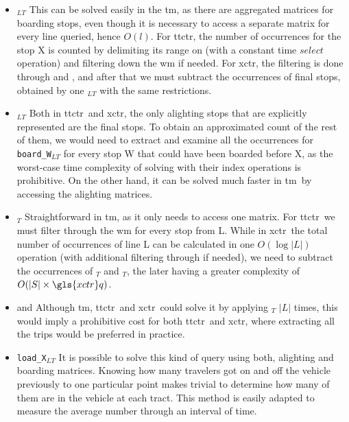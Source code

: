     \begin{itemize}
        \item \texttt{\boardX$_{LT}$} This can be solved easily in the \gls{tm}, as there are aggregated matrices for boarding stops, even though it is necessary to access a separate matrix for every line queried, hence $O(l)$. For \gls{ttctr}, the number of occurrences for the stop X is counted by delimiting its range on  (with a constant time $select$ operation) and filtering down the \gls{wm} if needed. For \gls{xctr}, the filtering is done through  and , and after that we must subtract the occurrences of final stops, obtained by one \texttt{\endX$_{LT}$} with the same restrictions.
        \item \texttt{\alightX$_{LT}$} Both in \gls{ttctr}~and \gls{xctr}, the only alighting stops that are explicitly represented are the final stops. To obtain an approximated count of the rest of them, we would need to extract and examine all the occurrences for \texttt{board\_W$_{LT}$} for every stop W that could have been boarded before X, as the worst-case time complexity of solving with their index operations is prohibitive. On the other hand, it can be solved much faster in \gls{tm}~by accessing the alighting matrices.
        \item \texttt{\useL$_T$} Straightforward in \gls{tm}, as it only needs to access one matrix. For \gls{ttctr}~we must filter through the \gls{wm} for every stop from L. While in \gls{xctr}~the total number of occurrences of line L can be calculated in one $O(\log|L|)$ operation (with additional filtering through  if needed), we need to subtract the occurrences of \startL$_T$ and \endL$_T$, the later having a greater complexity of $O(|S| \times \gls{xctr}q)$.
        \item \texttt{\boardT} and \texttt{\alightT} Although \gls{tm}, \gls{ttctr}~and \gls{xctr}~could solve it by applying \useL$_T$ $|L|$ times, this would imply a prohibitive cost for both \gls{ttctr}~and \gls{xctr}, where extracting all the trips would be preferred in practice.
        \item \texttt{load\_X$_{LT}$} It is possible to solve this kind of query using both, alighting and boarding matrices. Knowing how many travelers got on and off the vehicle previously to one particular point makes trivial to determine how many of them are in the vehicle at each tract. This method is easily adapted to measure the average number through an interval of time.

\end{itemize}
